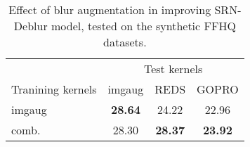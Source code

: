 \documentclass[final]{cvpr}
\newcommand{\Sref}[1]{Sec.~\ref{#1}}
\newcommand{\Fref}[1]{Fig.~\ref{#1}}
\newcommand{\cellimgtiny}[1]{
    \texttt{[image: \#1]}
}
\begin{document}




\setlength{\tabcolsep}{7pt}
\begin{table}[ht]
    \centering
    \begin{tabular}{lccc}
        \toprule
          & \multicolumn{3}{c}{Test kernels}\\
          \cmidrule(lr){2-4}
         Tranining kernels & imgaug & REDS & GOPRO\\
         \midrule
         imgaug & \textbf{28.64} & 24.22 & 22.96\\
         comb. & 28.30 & \textbf{28.37} & \textbf{23.92}\\
         \bottomrule
    \end{tabular}
    \vskip 0.05in
    \caption{Effect of blur augmentation in improving SRN-Deblur \cite{tao2018scale} model, tested on the synthetic FFHQ datasets.}
    \label{tab:blursynFFHQ}
    \vspace{-4mm}
\end{table}
\end{document}
